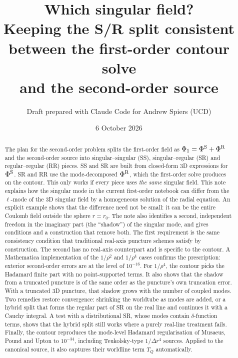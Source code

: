 \documentclass[11pt,a4paper]{article}
\title{Which singular field?\\[4pt]
\large Keeping the S/R split consistent between the first-order contour solve\\ and the second-order source}
\author{Draft prepared with Claude Code for Andrew Spiers (UCD)}
\date{6 October 2026}
\newcommand{\PhiS}{\Phi^{\rm S}}
\newcommand{\PhiR}{\Phi^{\rm R}}
\begin{document}
\maketitle

\begin{abstract}
The plan for the second-order problem splits the first-order field as $\Phi_1=\PhiS+\PhiR$ and the second-order source into singular--singular (SS), singular--regular (SR) and regular--regular (RR) pieces.
SS and SR are built from closed-form 3D expressions for $\PhiS$.
SR and RR use the mode-decomposed $\PhiR$, which the first-order solve produces on the contour.
This only works if every piece uses \emph{the same} singular field.
This note explains how the singular mode in the current first-order notebook can differ from the $\ell$-mode of the 3D singular field by a homogeneous solution of the radial equation.
An explicit example shows that the difference need not be small: it can be the entire Coulomb field outside the sphere $r=r_0$.
The note also identifies a second, independent freedom in the imaginary part (the ``shadow'') of the singular mode, and gives conditions and a construction that remove both.
The first requirement is the same consistency condition that traditional real-axis puncture schemes satisfy by construction.
The second has no real-axis counterpart and is specific to the contour.
A Mathematica implementation of the $1/\rho^2$ and $1/\rho^4$ cases confirms the prescription: exterior second-order errors are at the level of $10^{-16}$. For $1/\rho^4$, the contour picks the Hadamard finite part with no point-supported terms.
It also shows that the shadow from a truncated puncture is of the same order as the puncture's own truncation error.
With a truncated 3D puncture, that shadow grows with the number of coupled modes.
Two remedies restore convergence: shrinking the worldtube as modes are added, or a hybrid split that forms the regular part of SR on the real line and continues it with a Cauchy integral.
A test with a distributional SR, whose modes contain $\delta$-function terms, shows that the hybrid split still works where a purely real-line treatment fails.
Finally, the contour reproduces the mode-level Hadamard regularisation of Musaeus, Pound and Upton to $10^{-34}$, including Teukolsky-type $1/\Delta r^4$ sources.
Applied to the canonical source, it also captures their worldline term $T_Q$ automatically.
\end{abstract}

{\small\tableofcontents}
\clearpage
\end{document}
